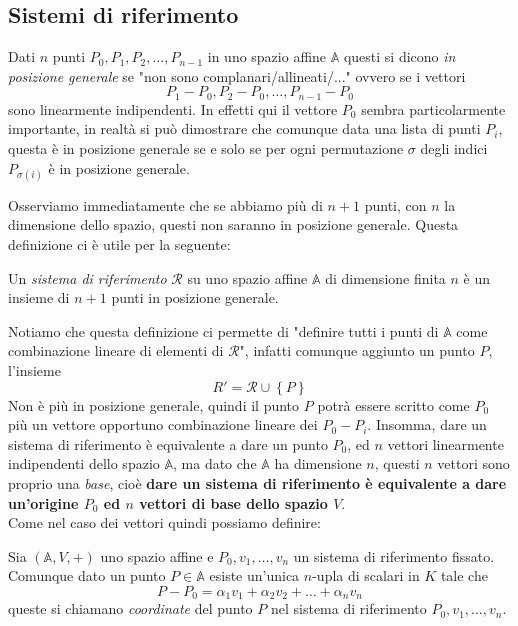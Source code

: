 \documentclass[11pt]{scrartcl}
\begin{document}
   	 \subsection{Sistemi di riferimento}
   	 \begin{definition}
   	 	Dati $n$ punti $P_0,P_1,P_2,\dots,P_{n-1}$ in uno spazio affine $\mathbb{A}$ questi si dicono \textit{in posizione generale} se "non sono complanari/allineati/..." ovvero se i vettori
   	 	$$P_1-P_0,P_2-P_0,\dots,P_{n-1}-P_0$$
   	 	sono linearmente indipendenti. In effetti qui il vettore $P_0$ sembra particolarmente importante, in realtà si può dimostrare che comunque data una lista di punti $P_i$, questa è in posizione generale se e solo se per ogni permutazione $\sigma$ degli indici $P_{\sigma(i)}$ è in posizione generale.
   	 \end{definition}
   	 Osserviamo immediatamente che se abbiamo più di $n+1$ punti, con $n$ la dimensione dello spazio, questi non saranno in posizione generale. Questa definizione ci è utile per la seguente:
   	 \begin{definition}
   	 	Un \textit{sistema di riferimento} $\mathcal{R}$ su uno spazio affine $\mathbb{A}$ di dimensione finita $n$ è un insieme di $n+1$ punti in posizione generale.
   	 \end{definition}
   	 Notiamo che questa definizione ci permette di "definire tutti i punti di $\mathbb{A}$ come combinazione lineare di elementi di $\mathcal{R}$", infatti comunque aggiunto un punto $P$, l'insieme
   	 $$R'=\mathcal{R}\cup \left\{P\right\}$$
   	 Non è più in posizione generale, quindi il punto $P$ potrà essere scritto come $P_0$ più un vettore opportuno combinazione lineare dei $P_0-P_i$. Insomma, dare un sistema di riferimento è equivalente a dare un punto $P_0$, ed $n$ vettori linearmente indipendenti dello spazio $\mathbb{A}$, ma dato che $\mathbb{A}$ ha dimensione $n$, questi $n$ vettori sono proprio una \textit{base}, cioè \textbf{dare un sistema di riferimento è equivalente a dare un'origine $P_0$ ed $n$ vettori di base dello spazio $V$}. \\
   	 Come nel caso dei vettori quindi possiamo definire:
   	 \begin{definition}
   	 	Sia $\left(\mathbb{A},V,+\right)$ uno spazio affine e $P_0,v_1,\dots,v_n$ un sistema di riferimento fissato. Comunque dato un punto $P\in \mathbb{A}$ esiste un'unica $n$-upla di scalari in $K$ tale che 
   	 	$$P-P_0=\alpha_1v_1+\alpha_2v_2+\dots+\alpha_nv_n$$
   	 	queste si chiamano \textit{coordinate} del punto $P$ nel sistema di riferimento $P_0,v_1,\dots,v_n$.
   	 \end{definition}
\end{document}
